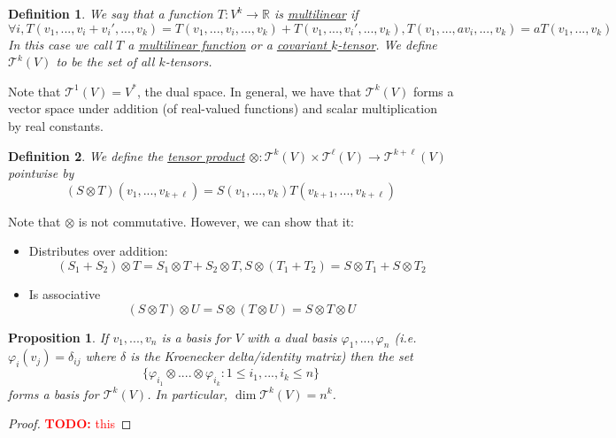\documentclass{article}
\newtheorem{definition}{Definition}
\newtheorem{proposition}{Proposition}
\newcommand{\reals}[0]{\mathbb{R}}
\newcommand{\mc}[1]{\mathcal{#1}}
\newcommand{\TODO}[1]{\textcolor{red}{\textbf{TODO:} #1}}
\begin{document}
\begin{definition}
  We say that a function \(T: V^k \to \reals\) is \underline{multilinear} if
  \begin{equation}
    \forall i, T(v_1,...,v_i + v_i',...,v_k) = T(v_1,...,v_i,...,v_k) + T(v_1,...,v_i',...,v_k), T(v_1,...,av_i,...,v_k) = aT(v_1,...,v_k)
  \end{equation}
  In this case we call \(T\) a \underline{multilinear function} or a \underline{covariant \(k\)-tensor}. We define \(\mc{T}^k(V)\) to be the set of all \(k\)-tensors.
\end{definition}
Note that \(\mc{T}^1(V) = V^*\), the dual space. In general, we have that \(\mc{T}^k(V)\) forms a vector space under addition (of real-valued functions) and scalar multiplication by real constants.
\begin{definition}
  We define the \underline{tensor product} \(\otimes: \mc{T}^k(V) \times \mc{T}^\ell(V) \to \mc{T}^{k + \ell}(V)\) pointwise by
  \begin{equation}
    (S \otimes T)(v_1,...,v_{k + \ell}) = S(v_1,...,v_k)T(v_{k + 1},...,v_{k + \ell})
  \end{equation}
\end{definition}
Note that \(\otimes\) is not commutative. However, we can show that it:
\begin{itemize}
  \item Distributes over addition:
  \begin{equation}
    (S_1 + S_2) \otimes T = S_1 \otimes T + S_2 \otimes T, S \otimes (T_1 + T_2) = S \otimes T_1 + S \otimes T_2
  \end{equation}
  \item Is associative
  \begin{equation}
    (S \otimes T) \otimes U = S \otimes (T \otimes U) = S \otimes T \otimes U
  \end{equation}
\end{itemize}

\begin{proposition}
  If \(v_1,...,v_n\) is a basis for \(V\) with a dual basis \(\varphi_1,...,\varphi_n\) (i.e. \(\varphi_i(v_j) = \delta_{ij}\) where \(\delta\) is the Kroenecker delta/identity matrix) then the set
  \begin{equation}
    \{\varphi_{i_1} \otimes .... \otimes \varphi_{i_k} : 1 \leq i_1,...,i_k \leq n\}
  \end{equation}
  forms a basis for \(\mc{T}^k(V)\). In particular, \(\dim\mc{T}^k(V) = n^k\).
\end{proposition}
\begin{proof}
  \TODO{this}
\end{proof}
\end{document}
